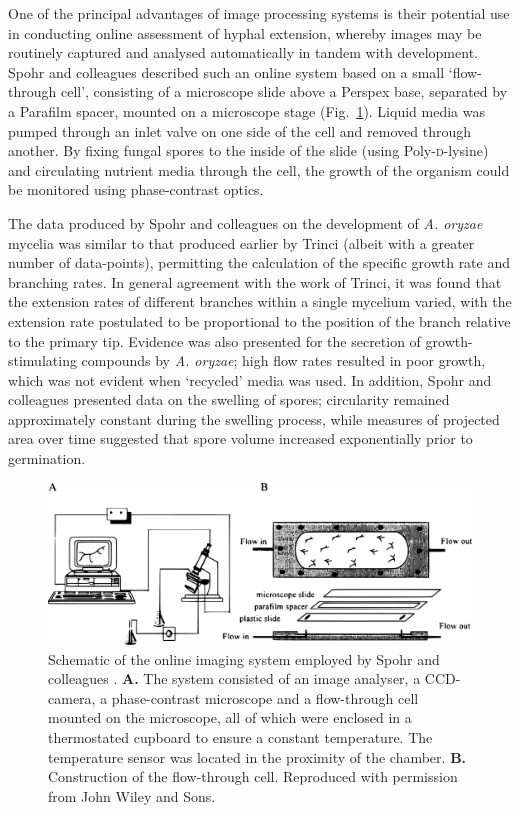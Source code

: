 One of the principal advantages of image processing systems is their potential use in conducting online assessment of hyphal extension, whereby images may be routinely captured and analysed automatically in tandem with development. Spohr and colleagues described such an online system \cite{spohr1998} based on a small \lq flow-through cell', consisting of a microscope slide above a Perspex base, separated by a Parafilm{\texttrademark} spacer, mounted on a microscope stage (Fig.~\ref{fig:Fig1Spohr1998}). Liquid media was pumped through an inlet valve on one side of the cell and removed through another. By fixing fungal spores to the inside of the slide (using Poly-{\scshape d}-lysine) and circulating nutrient media through the cell, the growth of the organism could be monitored using phase-contrast optics.

The data produced by Spohr and colleagues on the development of \emph{A. oryzae} mycelia was similar to that produced earlier by Trinci \cite{trinci1974} (albeit with a greater number of data-points), permitting the calculation of the specific growth rate and branching rates. In general agreement with the work of Trinci, it was found that the extension rates of different branches within a single mycelium varied, with the extension rate postulated to be proportional to the position of the branch relative to the primary tip. Evidence was also presented for the secretion of growth-stimulating compounds by \emph{A. oryzae}; high flow rates resulted in poor growth, which was not evident when \lq recycled' media was used. In addition, Spohr and colleagues presented data on the swelling of spores; circularity remained approximately constant during the swelling process, while measures of projected area over time suggested that spore volume increased exponentially prior to germination.

\begin{figure}[tb]
	\centering
	\includegraphics[width=(\textwidth - 1cm)]{../C1/Fig1Spohr1998}
	\caption{Schematic of the online imaging system employed by Spohr and colleagues \cite{spohr1998}. {\bf A.} The system consisted of an image analyser, a CCD-camera, a phase-contrast microscope and a flow-through cell mounted on the microscope, all of which were enclosed in a thermostated cupboard to ensure a constant temperature. The temperature sensor was located in the proximity of the chamber. {\bf B.} Construction of the flow-through cell. Reproduced with permission from John Wiley and Sons.}
	\label{fig:Fig1Spohr1998}
\end{figure}

